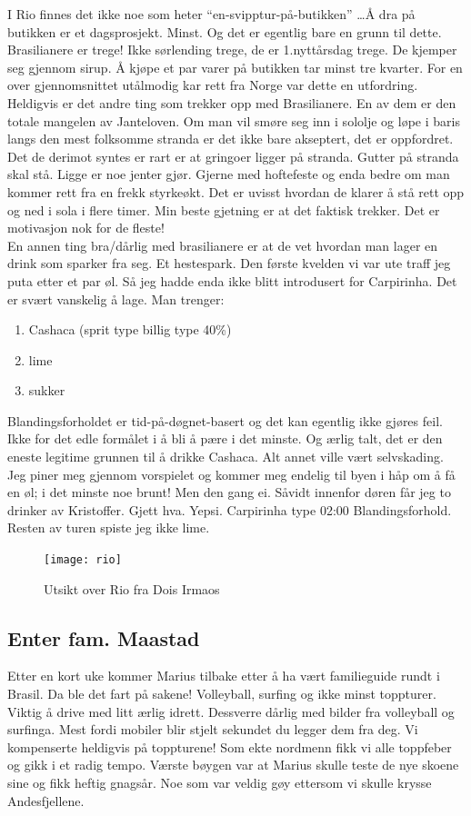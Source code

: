 I Rio finnes det ikke noe som heter ``en-svipptur-på-butikken'' \ldots Å dra på butikken er
et dagsprosjekt. Minst.  Og det er egentlig bare en grunn til dette.
Brasilianere er trege! Ikke sørlending trege, de er 1.nyttårsdag
trege. De kjemper seg gjennom sirup. Å kjøpe et par varer på butikken
tar minst tre kvarter. For en over gjennomsnittet utålmodig kar rett
fra Norge var dette en utfordring.
Heldigvis er det andre ting som trekker opp med Brasilianere. En av
dem er den totale mangelen av Janteloven. Om man vil smøre seg inn i
sololje og løpe i baris langs den mest folksomme stranda er det ikke
bare akseptert, det er oppfordret. Det de derimot syntes er rart er
at gringoer ligger på stranda. Gutter på stranda skal stå.
Ligge er noe jenter gjør. Gjerne med hoftefeste og enda bedre om man kommer rett fra en frekk styrkeøkt. Det er uvisst hvordan de klarer å stå rett opp
og ned i sola i flere timer. Min beste gjetning er at det faktisk
trekker. Det er motivasjon nok for de fleste!\\

En annen ting bra/dårlig med brasilianere er at de vet hvordan man
lager en drink som sparker fra seg. Et hestespark. Den første kvelden
vi var ute traff jeg puta etter et par øl. Så jeg hadde enda ikke
blitt introdusert for Carpirinha.
Det er svært vanskelig å lage. Man trenger:

\begin{enumerate}
	\item Cashaca (sprit type billig type 40\%)
	\item lime 
	\item sukker
\end{enumerate}

Blandingsforholdet er tid-på-døgnet-basert og det kan egentlig ikke
gjøres feil. Ikke for det edle formålet i å bli å pære i det minste.
Og ærlig talt, det er den eneste legitime grunnen til å drikke
Cashaca. Alt annet ville vært selvskading. Jeg piner meg gjennom
vorspielet og kommer meg endelig til byen i håp om å få en øl; i det
minste noe brunt! Men den gang ei. Såvidt innenfor døren får jeg to
drinker av Kristoffer. Gjett hva. Yepsi. Carpirinha type 02:00
Blandingsforhold. Resten av turen spiste jeg ikke lime.
\begin{figure}[H]
	\centering
	\texttt{[image: rio]}
	\caption*{Utsikt over Rio fra Dois Irmaos}
	\label{fig:dois}
\end{figure}
\subsection*{Enter fam. Maastad}
Etter en kort uke kommer Marius tilbake etter å ha vært familieguide
rundt i
Brasil. Da ble det fart på sakene!
Volleyball, surfing og ikke minst toppturer. Viktig å drive med litt
ærlig idrett. Dessverre dårlig med bilder fra volleyball og surfinga.
Mest fordi mobiler blir stjelt sekundet du legger dem fra deg. Vi
kompenserte heldigvis på toppturene! Som ekte nordmenn fikk vi
alle toppfeber og gikk i et radig tempo. Værste bøygen var at Marius
skulle teste de nye skoene sine og fikk heftig gnagsår. Noe som var
veldig gøy ettersom vi skulle krysse Andesfjellene. 

